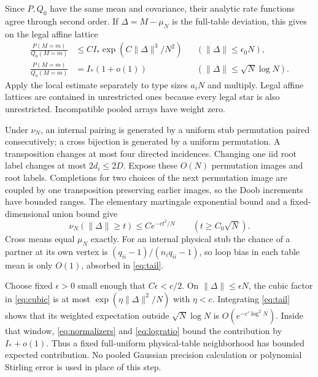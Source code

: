 \documentclass[11pt]{article}
\begin{document}
Since $P,Q_0$ have the same mean and covariance, their analytic rate functions agree through second order. If $\Delta=M-\mu_N$ is the full-table deviation, this gives on the legal affine lattice
\begin{align}
 \frac{P(M=m)}{Q_0(M=m)}&\le C I_*\exp(C\|\Delta\|^3/N^2)
                  &&(\|\Delta\|\le\epsilon_0N),\label{eq:cubic}\\
 \frac{P(M=m)}{Q_0(M=m)}&=I_*(1+o(1))
                  &&(\|\Delta\|\le\sqrt N\log N).
 \label{eq:logratio}
\end{align}
Apply the local estimate separately to type sizes $a_iN$ and multiply. Legal affine lattices are contained in unrestricted ones because every legal star is also unrestricted. Incompatible pooled arrays have weight zero.

Under $\nu_N$, an internal pairing is generated by a uniform stub permutation paired consecutively; a cross bijection is generated by a uniform permutation. A transposition changes at most four directed incidences. Changing one iid root label changes at most $2d_i\le2D$. Expose these $O(N)$ permutation images and root labels. Completions for two choices of the next permutation image are coupled by one transposition preserving earlier images, so the Doob increments have bounded ranges. The elementary martingale exponential bound and a fixed-dimensional union bound give
\begin{equation}\label{eq:tail}
 \nu_N(\|\Delta\|\ge t)\le C e^{-ct^2/N}\qquad(t\ge C_0\sqrt N).
\end{equation}
Cross means equal $\mu_N$ exactly. For an internal physical stub the chance of a partner at its own vertex is $(q_{ii}-1)/(n_iq_{ii}-1)$, so loop bias in each table mean is only $O(1)$, absorbed in \eqref{eq:tail}.

Choose fixed $\epsilon>0$ small enough that $C\epsilon<c/2$. On $\|\Delta\|\le\epsilon N$, the cubic factor in \eqref{eq:cubic} is at most $\exp(\eta\|\Delta\|^2/N)$ with $\eta<c$. Integrating \eqref{eq:tail} shows that its weighted expectation outside $\sqrt N\log N$ is $O(e^{-c'\log^2N})$. Inside that window, \eqref{eq:normalizers} and \eqref{eq:logratio} bound the contribution by $I_*+o(1)$. Thus a fixed full-uniform physical-table neighborhood has bounded expected contribution. No pooled Gaussian precision calculation or polynomial Stirling error is used in place of this step.
\end{document}
